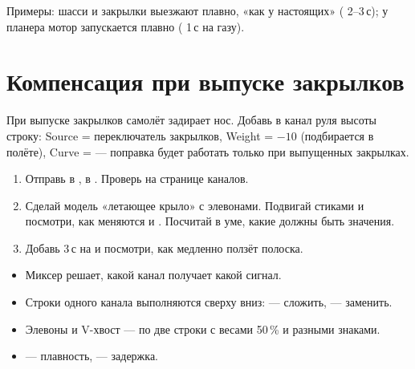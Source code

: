 Примеры: шасси и закрылки выезжают плавно, «как у настоящих» ( 2--3\,с);
у планера мотор запускается плавно ( 1\,с на газу).

\section{Компенсация при выпуске закрылков}

При выпуске закрылков самолёт задирает нос. Добавь в канал руля высоты строку:
Source = переключатель закрылков, Weight = $-10$ (подбирается в полёте),
Curve =  --- поправка будет работать только при выпущенных закрылках.

\begin{tryit}
\begin{enumerate}
  \item Отправь  в ,  в . Проверь на странице каналов.
  \item Сделай модель «летающее крыло» с элевонами. Подвигай стиками и посмотри, как меняются
         и . Посчитай в уме, какие должны быть значения.
  \item Добавь  3\,с на  и посмотри, как медленно ползёт полоска.
\end{enumerate}
\end{tryit}

\begin{summary}
\begin{itemize}
  \item Миксер решает, какой канал получает какой сигнал.
  \item Строки одного канала выполняются сверху вниз:  --- сложить,
         --- заменить.
  \item Элевоны и V-хвост --- по две строки с весами 50\,\% и разными знаками.
  \item {} --- плавность,  --- задержка.
\end{itemize}
\end{summary}
